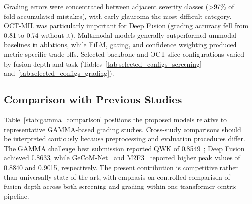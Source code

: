 \documentclass{ieeeaccess}
\begin{document}
Grading errors were concentrated between adjacent severity classes (>97\% of fold-accumulated mistakes), with early glaucoma the most difficult category. OCT-MIL was particularly important for Deep Fusion (grading accuracy fell from 0.81 to 0.74 without it). Multimodal models generally outperformed unimodal baselines in ablations, while FiLM, gating, and confidence weighting produced metric-specific trade-offs. Selected backbone and OCT-slice configurations varied by fusion depth and task (Tables~\ref{tab:selected_configs_screening} and~\ref{tab:selected_configs_grading}).

\subsection{Comparison with Previous Studies}
\label{subsec:comparison_prior_work}

Table~\ref{stab:gamma_comparison} positions the proposed models relative to representative GAMMA-based grading studies. Cross-study comparisons should be interpreted cautiously because preprocessing and evaluation procedures differ. The GAMMA challenge best submission reported QWK of 0.8549~\cite{wu2023gamma}; Deep Fusion achieved 0.8633, while GeCoM-Net~\cite{wang2024geometric} and M2F3~\cite{zhao2025enhancing} reported higher peak values of 0.8840 and 0.9015, respectively. The present contribution is competitive rather than universally state-of-the-art, with emphasis on controlled comparison of fusion depth across both screening and grading within one transformer-centric pipeline.
\end{document}

